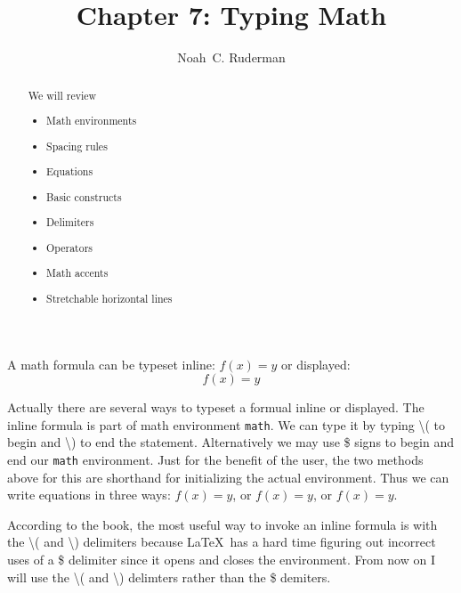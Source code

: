\documentclass[12pt]{amsart}
\begin{document}
	\title{Chapter 7: Typing Math}
	\author[N.\, C. Ruderman]{Noah~C. Ruderman}

	\begin{abstract}
		We will review
		\begin{center}
		\begin{itemize}
			\item Math environments
			\item Spacing rules
			\item Equations
			\item Basic constructs
			\item Delimiters
			\item Operators
			\item Math accents
			\item Stretchable horizontal lines
		\end{itemize}
		\end{center}
	\end{abstract}

	\maketitle 

A math formula can be typeset inline: $f(x) = y$ or displayed:
\[
f(x) = y
\]

Actually there are several ways to typeset a formual inline or displayed. The inline formula is part of math environment \texttt{math}. We can type it by typing \textbackslash( to begin and \textbackslash) to end the statement. Alternatively we may use \$ signs to begin and end our \texttt{math} environment. Just for the benefit of the user, the two methods above for this are shorthand for initializing the actual environment. Thus we can write equations in three ways: \( f(x) = y\), or $f(x) = y$, or 
\begin{math}
f(x) = y.
\end{math}


According to the book, the most useful way to invoke an inline formula is with the \textbackslash( and \textbackslash) delimiters because \LaTeX \ has a hard time figuring out incorrect uses of a \$ delimiter since it opens and closes the environment. From now on I will use the \textbackslash( and \textbackslash) delimters rather than the \$ demiters.
\end{document}

